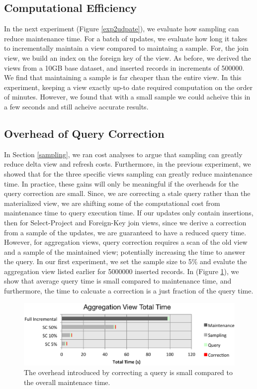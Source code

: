 \subsection{Computational Efficiency}
In the next experiment (Figure \ref{exp2udpate}), we evaluate how sampling can reduce maintenance time.
For a batch of updates, we evaluate how long it takes to incrementally maintain a view compared to maintaing a sample.
For, the join view, we build an index on the foreign key of the view.
As before, we derived the views from a 10GB base dataset, and inserted records in increments of 500000.
We find that maintaining a sample is far cheaper than the entire view. In this experiment, keeping a view exactly up-to date required computation on the order of minutes.
However, we found that with a small sample we could acheive this in a few seconds and still acheive accurate results.

\subsection{Overhead of Query Correction}
In Section \ref{sampling}, we ran cost analyses to argue that sampling can greatly reduce delta view and refresh costs.
Furthermore, in the previous experiment, we showed that for the three specific views sampling can greatly reduce maintenance time.
In practice, these gains will only be meaningful if the overheads for the query correction are small.
Since, we are correcting a stale query rather than the materialized view, we are shifting some of the computational cost from maintenance time to query execution time.
If our updates only contain insertions, then for Select-Project and Foreign-Key join views, since we derive a correction from a sample of the updates, we are guaranteed to have a reduced query time.
However, for aggregation views, query correction requires a scan of the old view and a sample of the maintained view; potentially increasing the time to 
answer the query.
In our first experiment, we set the sample size to 5\% and evalute the aggregation view listed earlier for 5000000 inserted records. 
In (Figure \ref{exp10overheads}), we show that average query time is small compared to maintenance time, and furthermore, 
the time to calcuate a correction is a just fraction of the query time.
\begin{figure}[h]
\label{exp10overheads}
\centering
 \includegraphics[width=\columnwidth]{exp/total_time_agg_view.png}
 \caption{The overhead introduced by correcting a query is small compared to the overall maintenace time.}
\end{figure}

